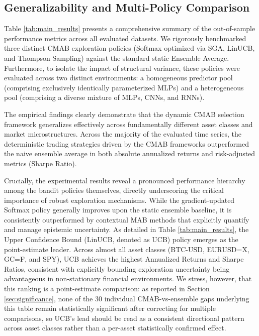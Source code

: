 \documentclass[pdflatex,sn-mathphys-num]{sn-jnl}
\theoremstyle{thmstyleone}%
\theoremstyle{thmstyletwo}%
\theoremstyle{thmstylethree}%
\begin{document}
\subsection{Generalizability and Multi-Policy Comparison}

Table \ref{tab:main_results} presents a comprehensive summary of the out-of-sample performance metrics across all evaluated datasets. We rigorously benchmarked three distinct CMAB exploration policies (Softmax optimized via SGA, LinUCB, and Thompson Sampling) against the standard static Ensemble Average. Furthermore, to isolate the impact of structural variance, these policies were evaluated across two distinct environments: a homogeneous predictor pool (comprising exclusively identically parameterized MLPs) and a heterogeneous pool (comprising a diverse mixture of MLPs, CNNs, and RNNs).

The empirical findings clearly demonstrate that the dynamic CMAB selection framework generalizes effectively across fundamentally different asset classes and market microstructures. Across the majority of the evaluated time series, the deterministic trading strategies driven by the CMAB frameworks outperformed the naive ensemble average in both absolute annualized returns and risk-adjusted metrics (Sharpe Ratio). 

Crucially, the experimental results reveal a pronounced performance hierarchy among the bandit policies themselves, directly underscoring the critical importance of robust exploration mechanisms. While the gradient-updated Softmax policy generally improves upon the static ensemble baseline, it is consistently outperformed by contextual MAB methods that explicitly quantify and manage epistemic uncertainty. As detailed in Table \ref{tab:main_results}, the Upper Confidence Bound (LinUCB, denoted as UCB) policy emerges as the point-estimate leader. Across almost all asset classes (BTC-USD, EURUSD=X, GC=F, and SPY), UCB achieves the highest Annualized Returns and Sharpe Ratios, consistent with explicitly bounding exploration uncertainty being advantageous in non-stationary financial environments. We stress, however, that this ranking is a point-estimate comparison: as reported in Section \ref{sec:significance}, none of the 30 individual CMAB-vs-ensemble gaps underlying this table remain statistically significant after correcting for multiple comparisons, so UCB's lead should be read as a consistent directional pattern across asset classes rather than a per-asset statistically confirmed effect.
\end{document}

